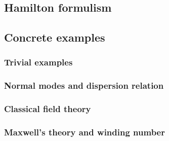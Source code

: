 \subsection{Hamilton formulism}

\subsection{Concrete examples}
\subsubsection{Trivial examples}
\subsubsection{Normal modes and dispersion relation}
\subsubsection{Classical field theory}
\subsubsection{Maxwell's theory and winding number}
